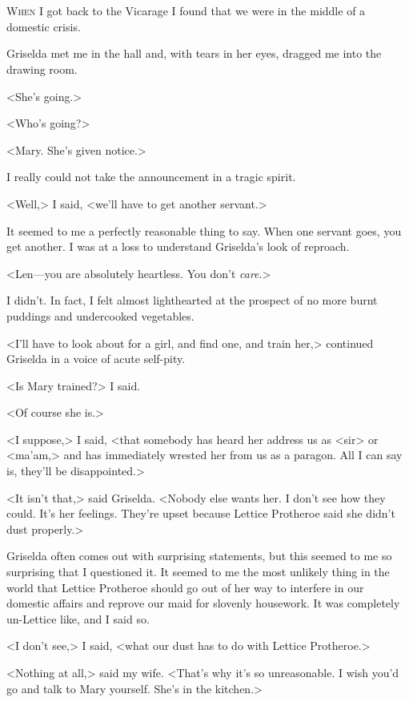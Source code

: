 \chapter[Chapter  \thechapter]{}


\lettrine{W}{hen} I got back to the Vicarage I found that we were in the middle of a domestic crisis.

\zz
Griselda met me in the hall and, with tears in her eyes, dragged me into the drawing room.

<She's going.>

<Who's going?>

<Mary. She's given notice.>

I really could not take the announcement in a tragic spirit.

<Well,> I said, <we'll have to get another servant.>

It seemed to me a perfectly reasonable thing to say. When one servant goes, you get another. I was at a loss to understand Griselda's look of reproach.

<Len—you are absolutely heartless. You don't \emph{care}.>

I didn't. In fact, I felt almost lighthearted at the prospect of no more burnt puddings and undercooked vegetables.

<I'll have to look about for a girl, and find one, and train her,> continued Griselda in a voice of acute self-pity.

<Is Mary trained?> I said.

<Of course she is.>

<I suppose,> I said, <that somebody has heard her address us as <sir> or <ma'am,> and has immediately wrested her from us as a paragon. All I can say is, they'll be disappointed.>

<It isn't that,> said Griselda. <Nobody else wants her. I don't see how they could. It's her feelings. They're upset because Lettice Protheroe said she didn't dust properly.>

Griselda often comes out with surprising statements, but this seemed to me so surprising that I questioned it. It seemed to me the most unlikely thing in the world that Lettice Protheroe should go out of her way to interfere in our domestic affairs and reprove our maid for slovenly housework. It was completely un-Lettice like, and I said so.

<I don't see,> I said, <what our dust has to do with Lettice Protheroe.>

<Nothing at all,> said my wife. <That's why it's so unreasonable. I wish you'd go and talk to Mary yourself. She's in the kitchen.>

